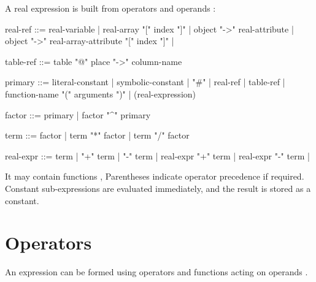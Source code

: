 A real expression is built from operators  and
operands :

\begin{footnotesize}
\begin{example}
real-ref  ::= real-variable |
              real-array "[" index "]" |
              object "->" real-attribute |
              object "->" real-array-attribute "[" index "]" |

table-ref ::= table "@" place "->" column-name

primary   ::= literal-constant |
              symbolic-constant |
              "#" |
              real-ref |
              table-ref |
              function-name "(" arguments ")" |
              (real-expression)

factor    ::= primary |
              factor "^" primary

term      ::= factor |
              term "*" factor |
              term "/" factor

real-expr ::= term |
              "+" term |
              "-" term |
              real-expr "+" term |
              real-expr "-" term |
\end{example}
\end{footnotesize}

It may contain functions ,
Parentheses indicate operator precedence if required.
Constant sub-expressions are evaluated immediately,
and the result is stored as a constant.

\section{Operators}
An expression can be formed using operators  and
functions 
acting on operands .

